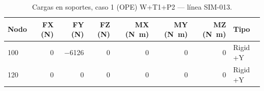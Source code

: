 \begin{table}[htbp]
  \centering
  \footnotesize
  \caption{Cargas en soportes, caso 1 (OPE) W+T1+P2 — línea SIM-013.}
  \label{tab:restricciones-ope}
  \begin{tabular}{lrrrrrrl}
    \toprule
    Nodo & FX (\si{N}) & FY (\si{N}) & FZ (\si{N}) & MX (\si{N.m}) & MY (\si{N.m}) & MZ (\si{N.m}) & Tipo \\
    \midrule
    100 & \num{0} & \num{-6126} & \num{0} & \num{0} & \num{0} & \num{0} & Rigid +Y \\
    120 & \num{0} & \num{0} & \num{0} & \num{0} & \num{0} & \num{0} & Rigid +Y \\
    \bottomrule
  \end{tabular}
\end{table}
